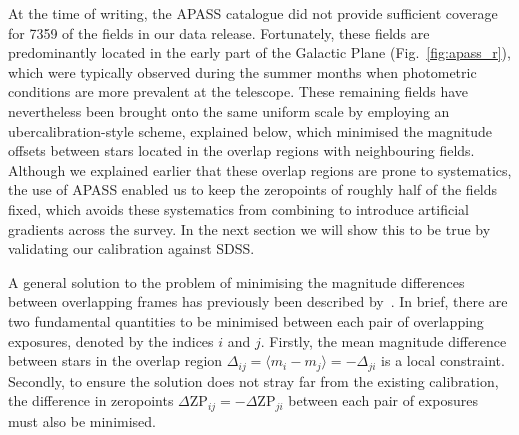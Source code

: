 \documentclass[useAMS,usenatbib]{mn2e}
\begin{document}
At the time of writing, the APASS catalogue did not provide 
sufficient coverage for 7359 of the fields in our data release.
Fortunately, these fields are predominantly located 
in the early part of the Galactic Plane (Fig.~\ref{fig:apass_r}),
which were typically observed during the summer months
when photometric conditions are more prevalent at the telescope.
These remaining fields have nevertheless 
been brought onto the same uniform scale 
by employing an ubercalibration-style scheme, explained below,
which minimised the magnitude offsets between stars
located in the overlap regions with neighbouring fields.
Although we explained earlier that these overlap regions
are prone to systematics, the use of APASS enabled us to
keep the zeropoints of roughly half of the fields fixed,
which avoids these systematics from combining to introduce
artificial gradients across the survey.
In the next section we will show this to be true by validating
our calibration against SDSS.

A general solution to the problem of minimising the magnitude
differences between overlapping frames has previously been
described by~\citet{Glazebrook1994}.
In brief, there are two fundamental quantities to be
minimised between each pair of overlapping exposures, 
denoted by the indices $i$ and $j$. 
Firstly, the mean magnitude difference between stars in the overlap
region $\Delta_{ij}=\langle m_i-m_j\rangle=-\Delta_{ji}$ is a local
constraint. 
Secondly, to ensure the solution does not stray far 
from the existing calibration, 
the difference in zeropoints 
$\Delta\mathrm{ZP}_{ij}=-\Delta\mathrm{ZP}_{ji}$ 
between each pair of exposures must also be minimised.
\end{document}
